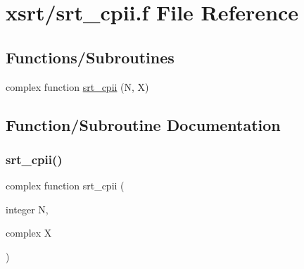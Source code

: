 \hypertarget{xsrt_2srt__cpii_8f}{}\section{xsrt/srt\+\_\+cpii.f File Reference}
\label{xsrt_2srt__cpii_8f}
\subsection*{Functions/\+Subroutines}
\begin{DoxyCompactItemize}
\item 
complex function \hyperlink{xsrt_2srt__cpii_8f_a3959b12c24723378936aeafb9dcc7071}{srt\+\_\+cpii} (N, X)
\end{DoxyCompactItemize}


\subsection{Function/\+Subroutine Documentation}
\mbox{\label{xsrt_2srt__cpii_8f_a3959b12c24723378936aeafb9dcc7071}} 
\subsubsection{\texorpdfstring{srt\+\_\+cpii()}{srt\_cpii()}}
{\footnotesize\ttfamily complex function srt\+\_\+cpii (\begin{DoxyParamCaption}\item[{integer}]{N,  }\item[{complex}]{X }\end{DoxyParamCaption})}

